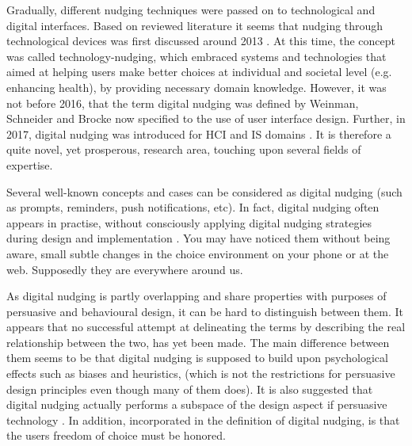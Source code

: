 Gradually, different nudging techniques were passed on to technological and digital interfaces. Based on reviewed literature it seems that nudging through technological devices was first discussed around 2013 
\cite{thomas_nudging_2013}.
At this time, the concept was called technology-nudging, which embraced systems and technologies that aimed at helping users make better choices at individual and societal level (e.g. enhancing health), by providing necessary domain knowledge. However, it was not before 2016, that the term digital nudging was defined by Weinman, Schneider and Brocke \cite{weinmann_digital_2016}
now specified to the use of user interface design. Further, in 2017, digital nudging was introduced for HCI and IS domains
\cite{schneider_digital_2018}.
It is therefore a quite novel, yet prosperous, research area, touching upon several fields of expertise.

Several well-known concepts and cases can be considered as digital nudging (such as prompts, reminders, push notifications, etc). In fact, digital nudging often appears in practise, without consciously applying digital nudging strategies during design and implementation \cite{schneider_digital_2018}.
You may have noticed them without being aware, small subtle changes in the choice environment on your phone or at the web. Supposedly they are everywhere around us. 

As digital nudging is partly overlapping and share properties with purposes of persuasive and behavioural design, it can be hard to distinguish between them. It appears that no successful attempt at delineating the terms by describing the real relationship between the two, has yet been made. The main difference between them seems to be that digital nudging is supposed to build upon psychological effects such as biases and heuristics\cite{mirsch_making_2018},
(which is not the restrictions for persuasive design principles even though many of them does). It is also suggested that digital nudging actually performs a subspace of the design aspect if persuasive technology
\cite{schneider_digital_2018}. 
In addition, incorporated in the definition of digital nudging, is that the users freedom of choice must be honored. 

